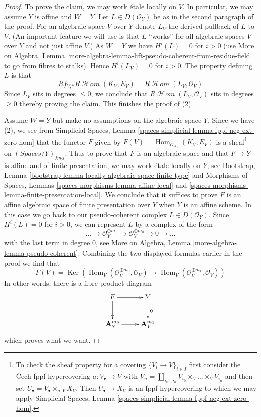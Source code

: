 \documentclass{stacks-project}
\theoremstyle{plain}
\theoremstyle{definition}
\theoremstyle{remark}
\numberwithin{equation}{subsection}
\def\Hom{\mathop{\mathrm{Hom}}\nolimits}
\def\SheafHom{\mathop{\mathcal{H}\!\mathit{om}}\nolimits}
\def\Ker{\mathop{\mathrm{Ker}}}
\begin{document}
\begin{proof}
\medskip\noindent
To prove the claim, we may work \'etale locally on $V$.
In particular, we may assume $Y$ is affine and $W = Y$.
Let $L \in D(\mathcal{O}_Y)$ be as in the second paragraph of the proof.
For an algebraic space $V$ over $Y$ denote $L_V$ the derived pullback of
$L$ to $V$. (An important feature we will use is that $L$ ``works'' for all
algebraic spaces $V$ over $Y$ and not just affine $V$.)
As $W = Y$ we have $H^i(L) = 0$ for $i > 0$
(use More on Algebra, Lemma
\ref{more-algebra-lemma-lift-pseudo-coherent-from-residue-field}
to go from fibres to stalks). Hence $H^i(L_V) = 0$ for $i > 0$.
The property defining $L$ is that
$$
Rf_{V, *}R\SheafHom(K_V, E_V) = R\SheafHom(L_V, \mathcal{O}_V)
$$
Since $L_V$ sits in degrees $\leq 0$, we conclude that
$R\SheafHom(L_V, \mathcal{O}_V)$ sits in degrees $\geq 0$
thereby proving the claim. This finishes the proof of (2).

\medskip\noindent
Assume $W = Y$ but make no assumptions on the algebraic space $Y$.
Since we have (2), we see from
Simplicial Spaces, Lemma \ref{spaces-simplicial-lemma-fppf-neg-ext-zero-hom}
that the functor $F$ given by $F(V) = \Hom_{\mathcal{O}_{X_V}}(K_V, E_V)$
is a sheaf\footnote{To check the sheaf property
for a covering $\{V_i \to V\}_{i \in I}$ first consider the
{\v C}ech fppf hypercovering $a : V_\bullet \to V$ with
$V_n = \coprod_{i_0 \ldots i_n} V_{i_0} \times_V \ldots \times_V V_{i_n}$
and then set $U_\bullet = V_\bullet \times_{a, V} X_V$. Then
$U_\bullet \to X_V$ is an fppf hypercovering to which we may
apply Simplicial Spaces, Lemma
\ref{spaces-simplicial-lemma-fppf-neg-ext-zero-hom}.}
on $(\textit{Spaces}/Y)_{fppf}$. Thus to prove that $F$
is an algebraic space and that $F \to Y$ is affine and of
finite presentation, we may work \'etale locally on $Y$; see
Bootstrap, Lemma \ref{bootstrap-lemma-locally-algebraic-space-finite-type}
and
Morphisms of Spaces, Lemmas \ref{spaces-morphisms-lemma-affine-local} and
\ref{spaces-morphisms-lemma-finite-presentation-local}. We conclude
that it suffices to prove $F$ is an affine algebraic space of
finite presentation over $Y$ when $Y$ is an affine scheme. In this
case we go back to our pseudo-coherent complex $L \in D(\mathcal{O}_Y)$.
Since $H^i(L) = 0$ for $i > 0$, we can represent $L$ by a complex
of the form
$$
\ldots \to \mathcal{O}_Y^{\oplus m_1} \to \mathcal{O}_Y^{\oplus m_0}
\to 0 \to \ldots
$$
with the last term in degree $0$, see More on Algebra, Lemma
\ref{more-algebra-lemma-pseudo-coherent}. Combining the two displayed formulas
earlier in the proof we find that
$$
F(V) =
\Ker(
\Hom_V(\mathcal{O}_V^{\oplus m_0}, \mathcal{O}_V)
\to 
\Hom_V(\mathcal{O}_V^{\oplus m_1}, \mathcal{O}_V)
)
$$
In other words, there is a fibre product diagram
$$
\xymatrix{
F \ar[d] \ar[r] & Y \ar[d]^0 \\
\mathbf{A}_Y^{m_0} \ar[r] & \mathbf{A}_Y^{m_1}
}
$$
which proves what we want.
\end{proof}
\end{document}
